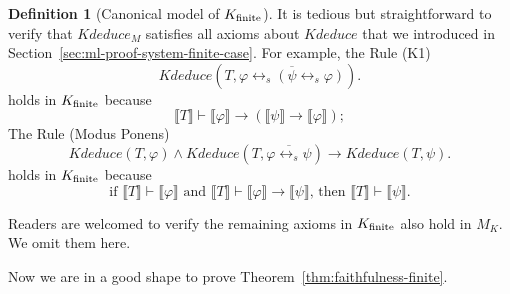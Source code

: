 \documentclass[UTF8,11pt]{article}
\newcounter{thmcounter}
\theoremstyle{plain}
\theoremstyle{definition}
\newtheorem{definition} [thmcounter]{Definition}
\theoremstyle{remark}
\newcommand{\Bracket}[1]{\llbracket#1\rrbracket}
\newcommand{\Kdeduce}{\mathit{Kdeduce}}
\begin{document}
\begin{definition}[Canonical model of ${K_\text{finite}}$]
    It is tedious but straightforward to verify that $\Kdeduce_M$ satisfies all axioms about $\Kdeduce$ that we introduced in Section~\cref{sec:ml-proof-system-finite-case}.
    For example, the Rule (K1)
    \begin{equation*}
    \Kdeduce(T, \overline{\varphi \leftrightarrow_s (\psi \leftrightarrow_s \varphi)}).
    \end{equation*}
    holds in ${K_\text{finite}}$ because
    $$\Bracket{T} \vdash \Bracket{\varphi} \to (\Bracket{\psi} \to \Bracket{\varphi});$$
    The Rule (Modus Ponens)
    \begin{equation*}
    \Kdeduce(T, \varphi) \wedge \Kdeduce(T, \overline{\varphi \leftrightarrow_s \psi}) \to 
    \Kdeduce(T, \psi).
    \end{equation*}
    holds in ${K_\text{finite}}$ because
    $$\text{if $\Bracket{T} \vdash \Bracket{\varphi}$ and $\Bracket{T} \vdash \Bracket{\varphi} \to \Bracket{\psi}$, then $\Bracket{T} \vdash \Bracket{\psi}$}.$$
    
    Readers are welcomed to verify the remaining axioms in ${K_\text{finite}}$ also hold in $M_K$.
    We omit them here.
    

\end{definition}


Now we are in a good shape to prove Theorem~\ref{thm:faithfulness-finite}.
\end{document}
